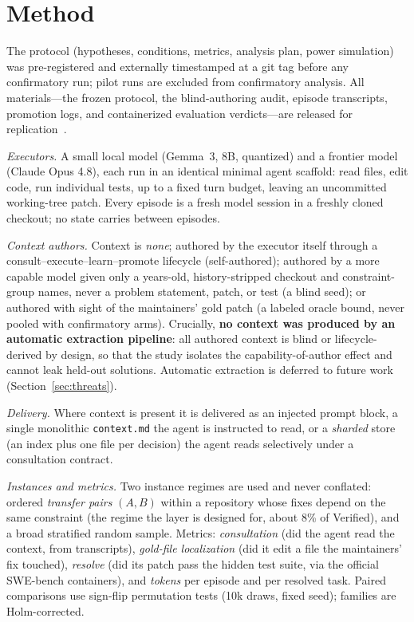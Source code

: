 \documentclass[sigconf,nonacm]{acmart}
\newcommand{\ctx}{\texttt{context.md}}
\begin{document}
\section{Method}
The protocol (hypotheses, conditions, metrics, analysis plan, power simulation)
was pre-registered and externally timestamped at a git tag before any
confirmatory run; pilot runs are excluded from confirmatory analysis. All
materials---the frozen protocol, the blind-authoring audit, episode transcripts,
promotion logs, and containerized evaluation verdicts---are released for
replication~\cite{artifact}.

\emph{Executors.} A small local model (Gemma~3, 8B, quantized) and a frontier
model (Claude Opus 4.8), each run in an identical minimal agent scaffold: read
files, edit code, run individual tests, up to a fixed turn budget, leaving an
uncommitted working-tree patch. Every episode is a fresh model session in a
freshly cloned checkout; no state carries between episodes.

\emph{Context authors.} Context is \emph{none}; authored by the executor itself
through a consult--execute--learn--promote lifecycle (self-authored); authored
by a more capable model given only a years-old, history-stripped checkout and
constraint-group names, never a problem statement, patch, or test (a blind seed);
or authored with sight of the maintainers' gold patch (a labeled oracle bound,
never pooled with confirmatory arms). Crucially, \textbf{no context was produced
by an automatic extraction pipeline}: all authored context is blind or
lifecycle-derived by design, so that the study isolates the capability-of-author
effect and cannot leak held-out solutions. Automatic extraction is deferred to
future work (Section~\ref{sec:threats}).

\emph{Delivery.} Where context is present it is delivered as an injected prompt
block, a single monolithic \ctx{} the agent is instructed to read, or a
\emph{sharded} store (an index plus one file per decision) the agent reads
selectively under a consultation contract.

\emph{Instances and metrics.} Two instance regimes are used and never conflated:
ordered \emph{transfer pairs} $(A,B)$ within a repository whose fixes depend on
the same constraint (the regime the layer is designed for, about 8\% of
Verified), and a broad stratified random sample. Metrics: \emph{consultation}
(did the agent read the context, from transcripts), \emph{gold-file localization}
(did it edit a file the maintainers' fix touched), \emph{resolve} (did its patch
pass the hidden test suite, via the official SWE-bench containers), and
\emph{tokens} per episode and per resolved task. Paired comparisons use sign-flip
permutation tests (10k draws, fixed seed); families are Holm-corrected.
\end{document}
